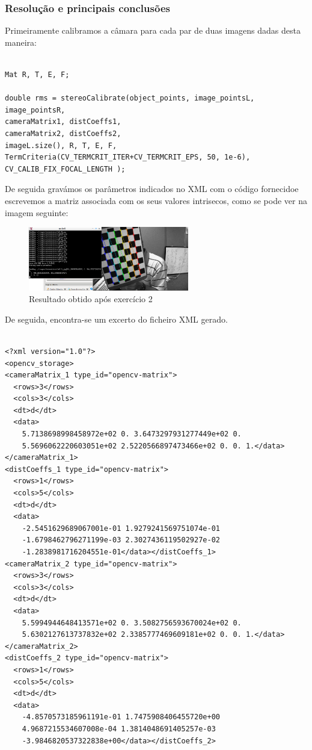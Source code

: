 \documentclass[portuguese, times, mirror]{revdetua}
\begin{document}
\subsubsection{Resolução e principais conclusões}

Primeiramente calibramos a câmara para cada par de duas imagens dadas desta maneira:

\begin{lstlisting}[caption=Função streoCalibrate,label=code:C]

Mat R, T, E, F;

double rms = stereoCalibrate(object_points, image_pointsL, image_pointsR,
cameraMatrix1, distCoeffs1,
cameraMatrix2, distCoeffs2,
imageL.size(), R, T, E, F,
TermCriteria(CV_TERMCRIT_ITER+CV_TERMCRIT_EPS, 50, 1e-6),
CV_CALIB_FIX_FOCAL_LENGTH );
\end{lstlisting}

De seguida gravámos os parâmetros indicados no XML com o código fornecidoe escrevemos a matriz associada com os seus valores intrisecos, como se pode ver na imagem seguinte: 

\newpage

\begin{figure}[ht!]
\centering
\includegraphics[width=70mm]{img/ex2.png}
\caption{Resultado obtido após exercício 2}
\end{figure}

De seguida, encontra-se um excerto do ficheiro XML gerado. 


\begin{lstlisting}[caption=Ficheiro XML gerado,label=code:C]

<?xml version="1.0"?>
<opencv_storage>
<cameraMatrix_1 type_id="opencv-matrix">
  <rows>3</rows>
  <cols>3</cols>
  <dt>d</dt>
  <data>
    5.7138698998458972e+02 0. 3.6473297931277449e+02 0.
    5.5696062220603051e+02 2.5220566897473466e+02 0. 0. 1.</data></cameraMatrix_1>
<distCoeffs_1 type_id="opencv-matrix">
  <rows>1</rows>
  <cols>5</cols>
  <dt>d</dt>
  <data>
    -2.5451629689067001e-01 1.9279241569751074e-01
    -1.6798462796271199e-03 2.3027436119502927e-02
    -1.2838981716204551e-01</data></distCoeffs_1>
<cameraMatrix_2 type_id="opencv-matrix">
  <rows>3</rows>
  <cols>3</cols>
  <dt>d</dt>
  <data>
    5.5994944648413571e+02 0. 3.5082756593670024e+02 0.
    5.6302127613737832e+02 2.3385777469609181e+02 0. 0. 1.</data></cameraMatrix_2>
<distCoeffs_2 type_id="opencv-matrix">
  <rows>1</rows>
  <cols>5</cols>
  <dt>d</dt>
  <data>
    -4.8570573185961191e-01 1.7475908406455720e+00
    4.9687215534607008e-04 1.3814048691405257e-03
    -3.9846820537322838e+00</data></distCoeffs_2>
    
\end{lstlisting}
\end{document}
